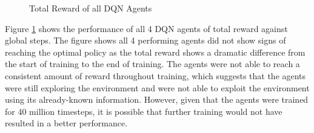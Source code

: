 \begin{figure}[H]
    \centering
    \caption{Total Reward of all DQN Agents}
    \label{fig:DQN_total_reward}
\end{figure}

Figure \ref{fig:DQN_total_reward} shows the performance of all 4 DQN agents of total reward against global steps. The figure shows all 4 performing agents did not show signs of reaching the optimal policy as the total reward shows a dramatic difference from the start of training to the end of training. The agents were not able to reach a consistent amount of reward throughout training, which suggests that the agents were still exploring the environment and were not able to exploit the environment using its already-known information. However, given that the agents were trained for 40 million timesteps, it is possible that further training would not have resulted in a better performance.

